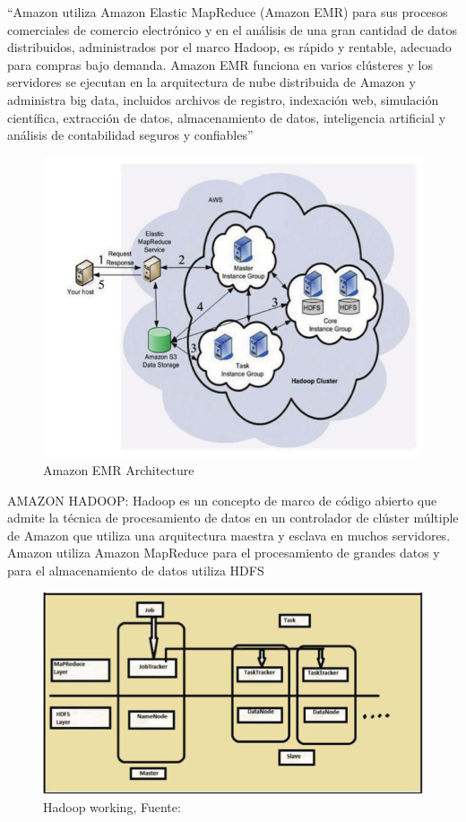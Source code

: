 “Amazon utiliza Amazon Elastic MapReduce (Amazon EMR) para sus procesos comerciales de comercio electrónico y en el análisis de una gran cantidad de datos distribuidos, administrados por el marco Hadoop, es rápido y rentable, adecuado para compras bajo demanda. Amazon EMR funciona en varios clústeres y los servidores se ejecutan en la arquitectura de nube distribuida de Amazon y administra big data, incluidos archivos de registro, indexación web, simulación científica, extracción de datos, almacenamiento de datos, inteligencia artificial y análisis de contabilidad seguros y confiables” 

\begin{figure}[h]
	\centering
	\includegraphics[scale=.4] {img/A-EMR-Arch}
	\caption{Amazon EMR Architecture}
	\label{fig:2}	
\end{figure}

AMAZON HADOOP: Hadoop es un concepto de marco de código abierto que admite la técnica de procesamiento de datos en un controlador de clúster múltiple de Amazon que utiliza una arquitectura maestra y esclava en muchos servidores. Amazon utiliza Amazon MapReduce para el procesamiento de grandes datos y para el almacenamiento de datos utiliza HDFS 
\begin{figure}[h]
	\centering
	\includegraphics[scale=.4] {img/hadoop-w}
	\caption{Hadoop working, Fuente: }
	\label{fig:3}	
\end{figure}



